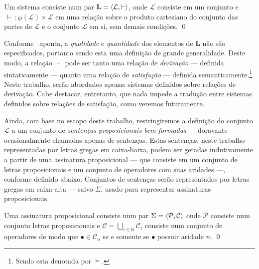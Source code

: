 \begin{definition}[Sistema]
    Um sistema consiste num par $\mathbf{L} = \langle\mathcal{L}, \vdash\rangle$, onde $\mathcal{L}$ consiste em um conjunto e $\, \vdash \: : \wp(\mathcal{L}) \times \mathcal{L}$ em uma relação sobre o produto cartesiano do conjunto das partes de $\mathcal{L}$ e o conjunto $\mathcal{L}$ em si, sem demais condições.
    \qed{}
\end{definition}

Conforme~\cite{Beziau} aponta, a \emph{qualidade} e \emph{quantidade} dos elementos de $\mathbf{L}$ não são especificados, portanto sendo esta uma definição de grande generalidade. Deste modo, a relação $\vdash$ pode ser tanto uma relação de \emph{derivação} --- definida sintaticamente --- quanto uma relação de \emph{satisfação} --- definida semanticamente.\footnote{Sendo esta denotada por $\mathrel{\vDash}$.} Neste trabalho, serão abordados apenas sistemas definidos sobre relações de derivação. Cabe destacar, entretanto, que nada impede a tradução entre sistemas definidos sobre relações de satisfação, como veremos futuramente.

Ainda, com base no escopo deste trabalho, restringiremos a definição do conjunto $\mathcal{L}$ a um conjunto de \emph{sentenças proposicionais bem-formadas} --- doravante ocasionalmente chamadas apenas de sentenças. Estas sentenças, neste trabalho representadas por letras gregas em caixa-baixa, podem ser geradas indutivamente a partir de uma assinatura proposicional --- que consiste em um conjunto de letras proposicionais e um conjunto de operadores com suas aridades ---, conforme definido abaixo. Conjuntos de sentenças serão representados por letras gregas em caixa-alta --- salvo $\Sigma$, usado para representar assinaturas proposicionais.

\begin{definition}[Assinatura]

    Uma assinatura proposicional consiste num par $\Sigma=\langle\mathcal{P},\mathcal{C}\rangle$ onde $\mathcal{P}$ consiste num conjunto letras proposicionais e $\mathcal{C}=\bigcup\limits_{i\in\mathbb{N}}\mathcal{C}_i$ consiste num conjunto de operadores de modo que $\bullet\in\mathcal{C}_n$ se e somente se $\bullet$ possuir aridade $n$.
    \qed{}
\end{definition}

